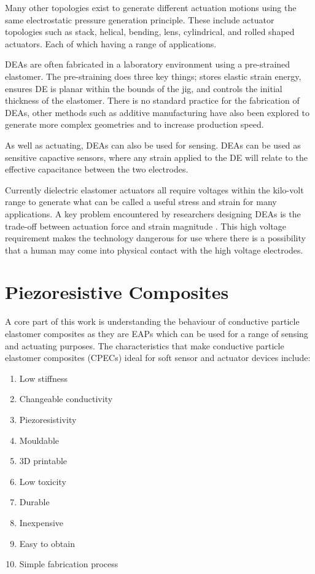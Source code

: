 Many other topologies exist to generate different actuation motions using the same electrostatic pressure generation principle. These include actuator topologies such as stack\citep{Hau2018,Kovacs2009}, helical\citep{Carpi2012}, bending\citep{Pfeil2020}, lens\citep{Ghilardi2019}, cylindrical, and rolled shaped actuators\citep{Amin2018}. Each of which having a range of applications.

DEAs are often fabricated in a laboratory environment using a pre-strained elastomer. The pre-straining does three key things; stores elastic strain energy, ensures DE is planar within the bounds of the jig, and controls the initial thickness of the elastomer. There is no standard practice for the fabrication of DEAs, other methods such as additive manufacturing have also been explored to generate more complex geometries and to increase production speed\citep{Park2018,McCoul2017}.

As well as actuating, DEAs can also be used for sensing. DEAs can be used as sensitive capactive sensors, where any strain applied to the DE will relate to the effective capacitance between the two electrodes\citep{Jung2008,Goulbourne2007,Gisby2013}. 

Currently dielectric elastomer actuators all require voltages within the kilo-volt range to generate what can be called a useful stress and strain for many applications. A key problem encountered by researchers designing DEAs is the trade-off between actuation force and strain magnitude \citep{Hau2018}. This high voltage requirement makes the technology dangerous for use where there is a possibility that a human may come into physical contact with the high voltage electrodes.


\section{Piezoresistive Composites}
\label{sec:Piezoresistive Composites}
A core part of this work is understanding the behaviour of conductive particle elastomer composites as they are EAPs which can be used for a range of sensing and actuating purposes. The characteristics that make conductive particle elastomer composites (CPECs) ideal for soft sensor and actuator devices include:
\begin{enumerate}
    \item Low stiffness
    \item Changeable conductivity
    \item Piezoresistivity
    \item Mouldable
    \item 3D printable
    \item Low toxicity
    \item Durable
    \item Inexpensive
    \item Easy to obtain
    \item Simple fabrication process
\end{enumerate}

